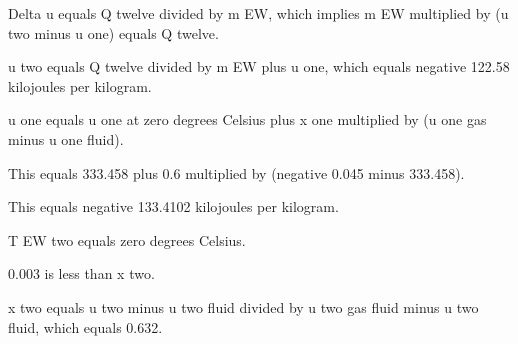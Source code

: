 Delta u equals Q twelve divided by m EW, which implies m EW multiplied by (u two minus u one) equals Q twelve.  

u two equals Q twelve divided by m EW plus u one, which equals negative 122.58 kilojoules per kilogram.  

u one equals u one at zero degrees Celsius plus x one multiplied by (u one gas minus u one fluid).  

This equals 333.458 plus 0.6 multiplied by (negative 0.045 minus 333.458).  

This equals negative 133.4102 kilojoules per kilogram.  

T EW two equals zero degrees Celsius.  

0.003 is less than x two.  

x two equals u two minus u two fluid divided by u two gas fluid minus u two fluid, which equals 0.632.